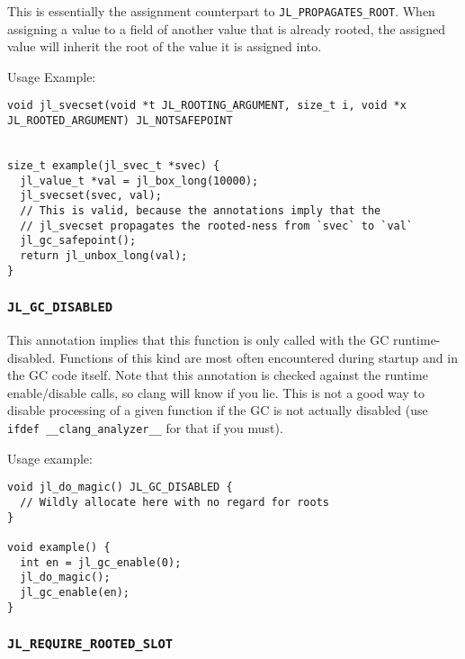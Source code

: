This is essentially the assignment counterpart to \texttt{JL\_PROPAGATES\_ROOT}. When assigning a value to a field of another value that is already rooted, the assigned value will inherit the root of the value it is assigned into.



Usage Example:




\begin{lstlisting}
void jl_svecset(void *t JL_ROOTING_ARGUMENT, size_t i, void *x JL_ROOTED_ARGUMENT) JL_NOTSAFEPOINT


size_t example(jl_svec_t *svec) {
  jl_value_t *val = jl_box_long(10000);
  jl_svecset(svec, val);
  // This is valid, because the annotations imply that the
  // jl_svecset propagates the rooted-ness from `svec` to `val`
  jl_gc_safepoint();
  return jl_unbox_long(val);
}
\end{lstlisting}



\hypertarget{9078058200292228414}{}


\subsubsection{\texttt{JL\_GC\_DISABLED}}



This annotation implies that this function is only called with the GC runtime-disabled. Functions of this kind are most often encountered during startup and in the GC code itself. Note that this annotation is checked against the runtime enable/disable calls, so clang will know if you lie. This is not a good way to disable processing of a given function if the GC is not actually disabled (use \texttt{ifdef \_\_clang\_analyzer\_\_} for that if you must).



Usage example:




\begin{lstlisting}
void jl_do_magic() JL_GC_DISABLED {
  // Wildly allocate here with no regard for roots
}

void example() {
  int en = jl_gc_enable(0);
  jl_do_magic();
  jl_gc_enable(en);
}
\end{lstlisting}



\hypertarget{14120380498342272328}{}


\subsubsection{\texttt{JL\_REQUIRE\_ROOTED\_SLOT}}



